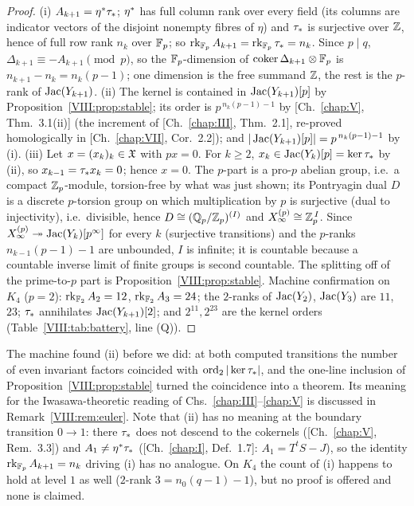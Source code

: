 \begin{proof}
(i) $A_{k+1}=\eta^*\tau_*$; $\eta^*$ has full column rank over every field (its columns are
indicator vectors of the disjoint nonempty fibres of $\eta$) and $\tau_*$ is surjective
over $\mathbb{Z}$, hence of full row rank $n_k$ over $\mathbb{F}_p$; so $\operatorname{rk}_{\mathbb{F}_p}A_{k+1}=\operatorname{rk}_{\mathbb{F}_p}\tau_*=n_k$.
Since $p\mid q$, $\Delta_{k+1}\equiv-A_{k+1}\pmod p$, so the $\mathbb{F}_p$-dimension of
$\operatorname{coker}\Delta_{k+1}\otimes\mathbb{F}_p$ is $n_{k+1}-n_k=n_k(p-1)$; one dimension is the free
summand $\mathbb{Z}$, the rest is the $p$-rank of $\operatorname{Jac}(Y_{k+1})$. (ii) The kernel is contained
in $\operatorname{Jac}(Y_{k+1})[p]$ by Proposition~\ref{VIII:prop:stable}; its order is $p^{\,n_k(p-1)-1}$ by
[Ch.~\ref{chap:V}, Thm.~3.1(ii)] (the increment of [Ch.~\ref{chap:III}, Thm.~2.1], re-proved homologically in
[Ch.~\ref{chap:VII}, Cor.~2.2]); and $|\operatorname{Jac}(Y_{k+1})[p]|=p^{\,n_k(p-1)-1}$ by (i). (iii) Let
$x=(x_k)_k\in\mathfrak{X}$ with $px=0$. For $k\ge2$, $x_k\in\operatorname{Jac}(Y_k)[p]=\ker\tau_*$ by (ii), so
$x_{k-1}=\tau_* x_k=0$; hence $x=0$. The $p$-part is a pro-$p$ abelian group, i.e.\ a
compact $\mathbb{Z}_p$-module, torsion-free by what was just shown; its Pontryagin dual $D$ is a
discrete $p$-torsion group on which multiplication by $p$ is surjective (dual to
injectivity), i.e.\ divisible, hence $D\cong(\mathbb{Q}_p/\mathbb{Z}_p)^{(I)}$ and
$X_\infty^{(p)}\cong\mathbb{Z}_p^{\,I}$. Since $X_\infty^{(p)}\twoheadrightarrow\operatorname{Jac}(Y_k)[p^\infty]$
for every $k$ (surjective transitions) and the $p$-ranks $n_{k-1}(p-1)-1$ are unbounded,
$I$ is infinite; it is countable because a countable inverse limit of finite groups is
second countable. The splitting off of the prime-to-$p$ part is
Proposition~\ref{VIII:prop:stable}. Machine confirmation on $K_4$ ($p=2$):
$\operatorname{rk}_{\mathbb{F}_2}A_2=12$, $\operatorname{rk}_{\mathbb{F}_2}A_3=24$; the $2$-ranks of $\operatorname{Jac}(Y_2)$, $\operatorname{Jac}(Y_3)$ are
$11$, $23$; $\tau_*$ annihilates $\operatorname{Jac}(Y_{k+1})[2]$; and $2^{11},2^{23}$ are the kernel
orders (Table~\ref{VIII:tab:battery}, line (Q)).
\end{proof}

The machine found (ii) before we did: at both computed transitions the number of even
invariant factors coincided with $\operatorname{ord}_2|\ker\tau_*|$, and the one-line inclusion of
Proposition~\ref{VIII:prop:stable} turned the coincidence into a theorem. Its meaning for the
Iwasawa-theoretic reading of Chs.~\ref{chap:III}--\ref{chap:V} is discussed in Remark~\ref{VIII:rem:euler}. Note
that (ii) has no meaning at the boundary transition $0\to1$: there $\tau_*$ does not
descend to the cokernels ([Ch.~\ref{chap:V}, Rem.~3.3]) and $A_1\ne\eta^*\tau_*$ ([Ch.~\ref{chap:I}, Def.~1.7]:
$A_1=T^{t}S-J$), so the identity $\operatorname{rk}_{\mathbb{F}_p}A_{k+1}=n_k$ driving (i) has no analogue. On
$K_4$ the count of (i) happens to hold at level $1$ as well ($2$-rank $3=n_0(q-1)-1$),
but no proof is offered and none is claimed.

